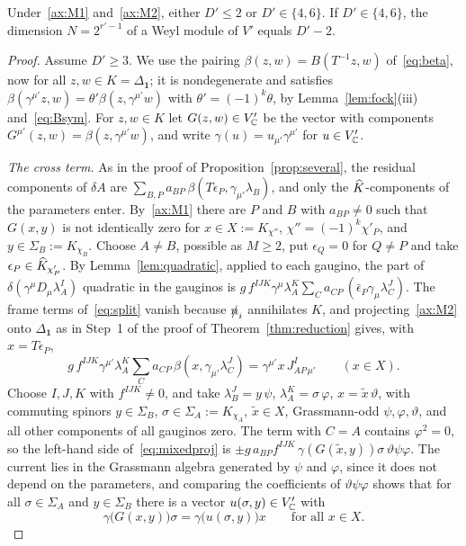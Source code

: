 \begin{theorem}
\label{thm:mixed}
Under~\ref{ax:M1} and~\ref{ax:M2}, either $D'\le2$ or $D'\in\{4,6\}$. If $D'\in\{4,6\}$, the dimension $N=2^{r'-1}$ of a Weyl module of $V'$ equals $D'-2$.
\end{theorem}

\begin{proof}
Assume $D'\ge3$. We use the pairing $\beta(z,w)=B(T^{-1}z,w)$ of~\eqref{eq:beta}, now for all $z,w\in K=\Delta_{\mathbf 1}$; it is nondegenerate and satisfies $\beta(\gamma^{\mu'}z,w)=\theta'\beta(z,\gamma^{\mu'}w)$ with $\theta'=(-1)^k\theta$, by Lemma~\ref{lem:fock}(iii) and~\eqref{eq:Bsym}. For $z,w\in K$ let $G(z,w)\in V'_{\mathbb{C}}$ be the vector with components $G^{\mu'}(z,w)=\beta(z,\gamma^{\mu'}w)$, and write $\gamma(u)=u_{\mu'}\gamma^{\mu'}$ for $u\in V'_{\mathbb{C}}$.

\emph{The cross term.} As in the proof of Proposition~\ref{prop:several}, the residual components of $\delta A$ are $\sum_{B,P}a_{BP}\,\beta(T\epsilon_P,\gamma_{\mu'}\lambda_B)$, and only the $\widehat{K}$-components of the parameters enter. By~\ref{ax:M1} there are $P$ and $B$ with $a_{BP}\ne0$ such that $G(x,y)$ is not identically zero for $x\in X:=K_{\chi''}$, $\chi''=(-1)^k\chi'_P$, and $y\in\Sigma_B:=K_{\chi_B}$. Choose $A\ne B$, possible as $M\ge2$, put $\epsilon_Q=0$ for $Q\ne P$ and take $\epsilon_P\in\widehat{K}_{\chi'_P}$. By Lemma~\ref{lem:quadratic}, applied to each gaugino, the part of $\delta(\gamma^\mu D_\mu\lambda^I_A)$ quadratic in the gauginos is $g\,f^{IJK}\gamma^\mu\lambda^K_A\sum_Ca_{CP}\,(\bar\epsilon_P\gamma_\mu\lambda^J_C)$. The frame terms of~\eqref{eq:split} vanish because $\slashed{n}_i$ annihilates $K$, and projecting~\ref{ax:M2} onto $\Delta_{\mathbf 1}$ as in Step~1 of the proof of Theorem~\ref{thm:reduction} gives, with $x=T\epsilon_P$,
\begin{equation}
\label{eq:mixedproj}
g\,f^{IJK}\gamma^{\mu'}\lambda^K_A\sum_Ca_{CP}\,\beta(x,\gamma_{\mu'}\lambda^J_C)=\gamma^{\mu'}x\,J^I_{AP\,\mu'}\qquad(x\in X).
\end{equation}
Choose $I,J,K$ with $f^{IJK}\ne0$, and take $\lambda^J_B=y\,\psi$, $\lambda^K_A=\sigma\,\varphi$, $x=\tilde x\,\vartheta$, with commuting spinors $y\in\Sigma_B$, $\sigma\in\Sigma_A:=K_{\chi_A}$, $\tilde x\in X$, Grassmann-odd $\psi,\varphi,\vartheta$, and all other components of all gauginos zero. The term with $C=A$ contains $\varphi^2=0$, so the left-hand side of~\eqref{eq:mixedproj} is $\pm g\,a_{BP}f^{IJK}\,\gamma(G(\tilde x,y))\sigma\,\vartheta\psi\varphi$. The current lies in the Grassmann algebra generated by $\psi$ and $\varphi$, since it does not depend on the parameters, and comparing the coefficients of $\vartheta\psi\varphi$ shows that for all $\sigma\in\Sigma_A$ and $y\in\Sigma_B$ there is a vector $u(\sigma,y)\in V'_{\mathbb{C}}$ with
\begin{equation}
\label{eq:crossabs}
\gamma\bigl(G(x,y)\bigr)\sigma=\gamma\bigl(u(\sigma,y)\bigr)x\qquad\text{for all }x\in X .
\end{equation}


\end{proof}
